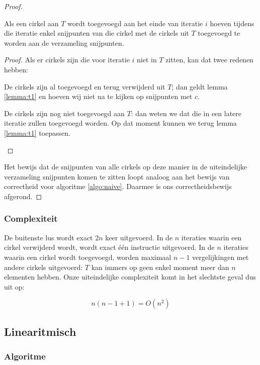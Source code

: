 \begin{proof}
\begin{gevolg} 
Als een cirkel aan $T$ wordt toegevoegd aan het einde van iteratie $i$
hoeven tijdens die iteratie enkel snijpunten van die cirkel met de
cirkels uit $T$ toegevoegd te worden aan de verzameling snijpunten.
\end{gevolg} 
\begin{proof}
Als er cirkels zijn die voor iteratie $i$ niet in $T$ zitten, kan dat
twee redenen hebben:
\begin{geval}
De cirkels zijn al toegevoegd en terug verwijderd uit $T$; dan geldt
lemma \ref{lemma:t1} en hoeven wij niet na te kijken op snijpunten met
$c$.
\end{geval}
\begin{geval}
De cirkels zijn nog niet toegevoegd aan $T$: dan weten we dat die in
een latere iteratie zullen toegevoegd worden. Op dat moment kunnen
we terug lemma \ref{lemma:t1} toepassen.
\end{geval}
\end{proof}

Het bewijs dat de snijpunten van alle cirkels op deze manier in de
uiteindelijke verzameling snijpunten komen te zitten loopt analoog aan
het bewijs van correctheid voor algoritme \ref{algo:naive}. Daarmee is
ons correctheidsbewijs afgerond.
\end{proof}
\subsubsection{Complexiteit}
De buitenste lus wordt exact $2n$ keer uitgevoerd. In de $n$ iteraties
waarin een cirkel verwijderd wordt, wordt exact \'e\'en instructie
uitgevoerd. In de $n$ iteraties waarin een cirkel wordt toegevoegd,
worden maximaal $n - 1$ vergelijkingen met andere cirkels uitgevoerd:
$T$ kan immers op geen enkel moment meer dan $n$ elementen
hebben. Onze uiteindelijke complexiteit komt in het slechtste geval dus uit op:

\[ n (n - 1 + 1) = O(n^2) \]


\subsection{Linearitmisch}
\label{sec:linearitmisch}

\subsubsection{Algoritme}

